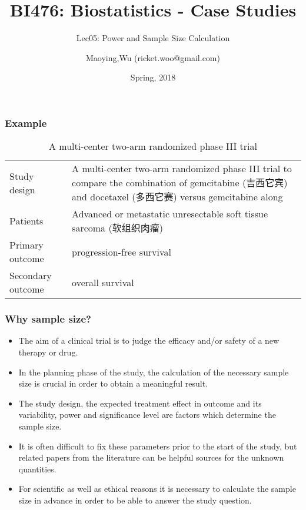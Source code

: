 \documentclass[table,10pt]{beamer}
\title[BI476]{BI476: Biostatistics - Case Studies}
\subtitle[anova]{Lec05: Power and Sample Size Calculation}
\author[Maoying Wu]{Maoying,Wu ({\small ricket.woo@gmail.com})}
\institute[CBB] %
{
  \inst{}
  Dept. of Bioinformatics \& Biostatistics\\
  Shanghai Jiao Tong University
}
\date{Spring, 2018}
\begin{document}
\begin{CJK*}{UTF8}{gbsn}

\begin{frame}
\titlepage
\end{frame}

\begin{frame}[t]
\frametitle{Example}
\begin{table}
\caption{A multi-center two-arm randomized phase III trial}
\small
\begin{tabular}{p{}p{}}
Study design & A multi-center two-arm randomized phase III trial to compare the combination of 
		gemcitabine (吉西它宾) and docetaxel (多西它赛) versus gemcitabine along\\
Patients & Advanced or metastatic unresectable soft tissue sarcoma (软组织肉瘤)\\
Primary outcome & progression-free survival\\
Secondary outcome & overall survival
\end{tabular}
\end{table}
\end{frame}

\begin{frame}[t]
\frametitle{Why sample size?}
\begin{itemize}
	\item The aim of a clinical trial is to judge the efficacy and/or 
		safety of a new therapy or drug.
	\item In the planning phase of the study, the calculation of the 
		necessary sample size is crucial in order to obtain a 
		meaningful result.
	\item The study design, the expected treatment \alert{effect} in outcome 
		and its \alert{variability}, \alert{power} and \alert{significance level} 
		are factors which determine the sample size.
	\item It is often difficult to fix these parameters prior to the start of the 
		study, but related papers from the literature can be helpful sources for 
		the unknown quantities.
	\item For scientific as well as ethical reasons it is necessary to calculate 
		the sample size in advance in order to be able to answer the study 
		question.
\end{itemize}
\end{frame}



\end{CJK*}
\end{document}
